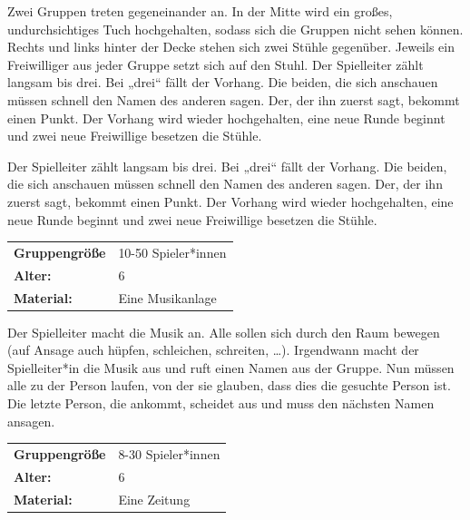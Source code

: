     Zwei Gruppen treten gegeneinander an. In der Mitte wird ein großes, undurchsichtiges Tuch hochgehalten, sodass sich die Gruppen nicht sehen können.  Rechts und links hinter der Decke stehen sich zwei Stühle gegenüber. Jeweils ein Freiwilliger aus jeder Gruppe setzt sich auf den Stuhl.  
Der Spielleiter zählt langsam bis drei. Bei „drei“ fällt der Vorhang. Die beiden, die sich anschauen müssen schnell den Namen des anderen sagen. Der, der ihn zuerst sagt, bekommt einen Punkt. Der Vorhang wird wieder hochgehalten, eine neue Runde beginnt und zwei neue Freiwillige besetzen die Stühle.

Der Spielleiter zählt langsam bis drei. Bei „drei“ fällt der Vorhang. Die beiden, die sich anschauen müssen schnell den Namen des anderen sagen. Der, der ihn zuerst sagt, bekommt einen Punkt. Der Vorhang wird wieder hochgehalten, eine neue Runde beginnt und zwei neue Freiwillige besetzen die Stühle.\\

\newpage

\begin{table}[H]
\begin{tabular}{>{\bfseries}lp{8cm}}
   Gruppengröße   & 10-50 Spieler*innen\\
    Alter: & 6 \\
    Material: & Eine Musikanlage \
\end{tabular}
\end{table} 
Der Spielleiter macht die Musik an. Alle sollen sich durch den Raum bewegen (auf Ansage auch hüpfen, schleichen, schreiten, …). Irgendwann macht der Spielleiter*in die 
Musik aus und ruft einen Namen aus der Gruppe. Nun müssen alle zu der Person laufen, von der sie glauben, dass dies die gesuchte Person ist. Die  letzte Person, die ankommt, scheidet aus und muss den nächsten Namen ansagen. \\



\Section{Zeitungsschlagen}
\begin{table}[H]
\begin{tabular}{>{\bfseries}lp{8cm}}
   Gruppengröße   & 8-30 Spieler*innen\\
    Alter: & 6 \\
    Material: & Eine Zeitung \\ 
\end{tabular}
\end{table} 

